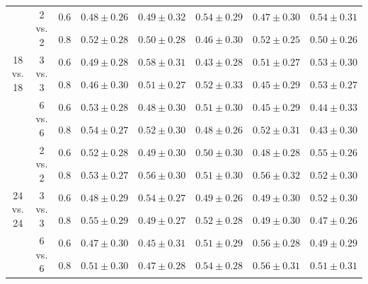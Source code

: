\documentclass[12pt,portrait]{article}
\begin{document}
\begin{table}[t]
{\begin{tabular}{ccc|ccccc}
    \multirow{6}{*}{18 vs. 18} & \multirow{2}{*}{2 vs. 2}   & 0.6 & $ 0.48 \pm 0.26 $ & $ 0.49 \pm 0.32 $ & $ 0.54 \pm 0.29 $ & $ 0.47 \pm 0.30 $ & $ 0.54 \pm 0.31 $ \\
                                 &                            & 0.8 & $ 0.52 \pm 0.28 $ & $ 0.50 \pm 0.28 $ & $ 0.46 \pm 0.30 $ & $ 0.52 \pm 0.25 $ & $ 0.50 \pm 0.26 $ \\
                                 & \multirow{2}{*}{3 vs. 3}   & 0.6 & $ 0.49 \pm 0.28 $ & $ 0.58 \pm 0.31 $ & $ 0.43 \pm 0.28 $ & $ 0.51 \pm 0.27 $ & $ 0.53 \pm 0.30 $ \\
                                 &                            & 0.8 & $ 0.46 \pm 0.30 $ & $ 0.51 \pm 0.27 $ & $ 0.52 \pm 0.33 $ & $ 0.45 \pm 0.29 $ & $ 0.53 \pm 0.27 $ \\
                                 & \multirow{2}{*}{6 vs. 6} & 0.6 & $ 0.53 \pm 0.28 $ & $ 0.48 \pm 0.30 $ & $ 0.51 \pm 0.30 $ & $ 0.45 \pm 0.29 $ & $ 0.44 \pm 0.33 $ \\
                                 &                            & 0.8 & $ 0.54 \pm 0.27 $ & $ 0.52 \pm 0.30 $ & $ 0.48 \pm 0.26 $ & $ 0.52 \pm 0.31 $ & $ 0.43 \pm 0.30 $ \\

    \hline \hline
    
    \multirow{6}{*}{24 vs. 24} & \multirow{2}{*}{2 vs. 2}   & 0.6 & $ 0.52 \pm 0.28 $ & $ 0.49 \pm 0.30 $ & $ 0.50 \pm 0.30 $ & $ 0.48 \pm 0.28 $ & $ 0.55 \pm 0.26 $ \\
                                 &                            & 0.8 & $ 0.53 \pm 0.27 $ & $ 0.56 \pm 0.30 $ & $ 0.51 \pm 0.30 $ & $ 0.56 \pm 0.32 $ & $ 0.52 \pm 0.30 $ \\
                                 & \multirow{2}{*}{3 vs. 3}   & 0.6 & $ 0.48 \pm 0.29 $ & $ 0.54 \pm 0.27 $ & $ 0.49 \pm 0.26 $ & $ 0.49 \pm 0.30 $ & $ 0.52 \pm 0.30 $ \\
                                 &                            & 0.8 & $ 0.55 \pm 0.29 $ & $ 0.49 \pm 0.27 $ & $ 0.52 \pm 0.28 $ & $ 0.49 \pm 0.30 $ & $ 0.47 \pm 0.26 $ \\
                                 & \multirow{2}{*}{6 vs. 6} & 0.6 & $ 0.47 \pm 0.30 $ & $ 0.45 \pm 0.31 $ & $ 0.51 \pm 0.29 $ & $ 0.56 \pm 0.28 $ & $ 0.49 \pm 0.29 $ \\
                                 &                            & 0.8 & $ 0.51 \pm 0.30 $ & $ 0.47 \pm 0.28 $ & $ 0.54 \pm 0.28 $ & $ 0.56 \pm 0.31 $ & $ 0.51 \pm 0.31 $ \\

    \hline
    
\end{tabular}}
\end{table}
\end{document}
